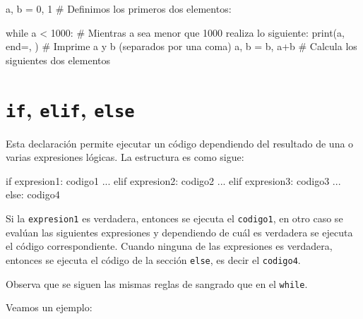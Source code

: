 \documentclass[
  letterpaper,
  DIV=11,
  numbers=noendperiod]{scrreprt}
\newenvironment{Shaded}{\begin{snugshade}}{\end{snugshade}}
\newcommand{\BuiltInTok}[1]{\textcolor[rgb]{0.00,0.23,0.31}{#1}}
\newcommand{\CommentTok}[1]{\textcolor[rgb]{0.37,0.37,0.37}{#1}}
\newcommand{\ControlFlowTok}[1]{\textcolor[rgb]{0.00,0.23,0.31}{#1}}
\newcommand{\DecValTok}[1]{\textcolor[rgb]{0.68,0.00,0.00}{#1}}
\newcommand{\NormalTok}[1]{\textcolor[rgb]{0.00,0.23,0.31}{#1}}
\newcommand{\OperatorTok}[1]{\textcolor[rgb]{0.37,0.37,0.37}{#1}}
\newcommand{\StringTok}[1]{\textcolor[rgb]{0.13,0.47,0.30}{#1}}
\begin{document}
\begin{Shaded}
\begin{Highlighting}[]
\NormalTok{a, b }\OperatorTok{=} \DecValTok{0}\NormalTok{, }\DecValTok{1} \CommentTok{\# Definimos los primeros dos elementos:}

\ControlFlowTok{while}\NormalTok{ a }\OperatorTok{\textless{}} \DecValTok{1000}\NormalTok{:       }\CommentTok{\# Mientras a sea menor que 1000 realiza lo siguiente:}
    \BuiltInTok{print}\NormalTok{(a, end}\OperatorTok{=}\StringTok{\textquotesingle{}, \textquotesingle{}}\NormalTok{)   }\CommentTok{\# Imprime a y b (separados por una coma)}
\NormalTok{    a, b }\OperatorTok{=}\NormalTok{ b, a}\OperatorTok{+}\NormalTok{b       }\CommentTok{\# Calcula los siguientes dos elementos}
\end{Highlighting}
\end{Shaded}


\chapter{\texorpdfstring{\texttt{if}, \texttt{elif},
\texttt{else}}{if, elif, else}}\label{if-elif-else}

Esta declaración permite ejecutar un código dependiendo del resultado de
una o varias expresiones lógicas. La estructura es como sigue:

\begin{Shaded}
\begin{Highlighting}[]
\ControlFlowTok{if}\NormalTok{ expresion1:}
\NormalTok{    codigo1 ...}
\ControlFlowTok{elif}\NormalTok{ expresion2:}
\NormalTok{    codigo2 ...}
\ControlFlowTok{elif}\NormalTok{ expresion3:}
\NormalTok{    codigo3 ...}
\ControlFlowTok{else}\NormalTok{:}
\NormalTok{    codigo4}
\end{Highlighting}
\end{Shaded}

Si la \texttt{expresion1} es verdadera, entonces se ejecuta el
\texttt{codigo1}, en otro caso se evalúan las siguientes expresiones y
dependiendo de cuál es verdadera se ejecuta el código correspondiente.
Cuando ninguna de las expresiones es verdadera, entonces se ejecuta el
código de la sección \texttt{else}, es decir el \texttt{codigo4}.

Observa que se siguen las mismas reglas de sangrado que en el
\texttt{while}.

Veamos un ejemplo:
\end{document}
